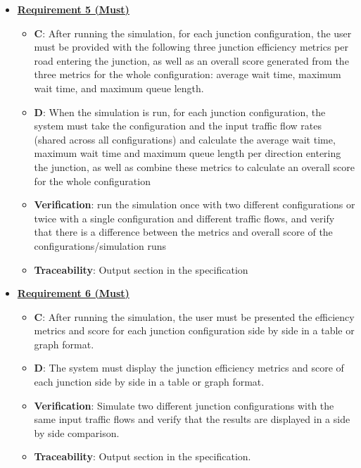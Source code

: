 \documentclass{article}
\begin{document}
\begin{itemize}
    \item \textbf{\underline{Requirement 5 (Must)}}
    \begin{itemize}
        \item \textbf{C}: After running the simulation, for each junction configuration, 
            the user must be provided with the following three junction efficiency metrics 
            per road entering the junction, as well as an overall score generated from the 
            three metrics for the whole configuration: average wait time, maximum wait time, 
            and maximum queue length.
        \item \textbf{D}: When the simulation is run, for each junction configuration, the system 
            must take the configuration and the input traffic flow rates (shared across all 
            configurations) and calculate the average wait time, maximum wait time and 
            maximum queue length per direction entering the junction, as well as combine 
            these metrics to calculate an overall score for the whole configuration
        \item \textbf{Verification}: run the simulation once with two different configurations 
            or twice with a single configuration and different traffic flows, and verify 
            that there is a difference between the metrics and overall score of the 
            configurations/simulation runs
        \item\textbf{Traceability}: Output section in the specification
    \end{itemize}

    \item \textbf{\underline{Requirement 6 (Must)}}
    \begin{itemize}
        \item \textbf{C}: After running the simulation, the user must be presented the efficiency metrics 
        and score for each junction configuration side by side in a table or graph format.
        \item \textbf{D}: The system must display the junction efficiency metrics and score of each junction 
        side by side in a table or graph format.
        \item \textbf{Verification}: Simulate two different junction configurations with the same 
            input traffic flows and verify that the results are displayed in a side by side comparison.
        \item\textbf{Traceability}: Output section in the specification.
    \end{itemize}


\end{itemize}
\end{document}
